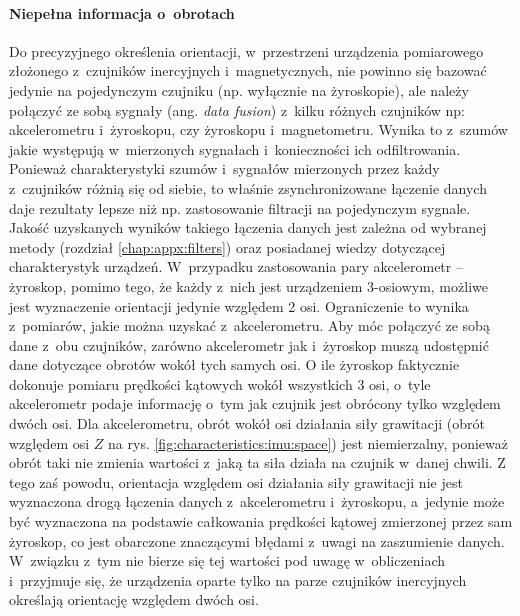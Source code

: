 \paragraph*{Niepełna informacja o~obrotach}
Do precyzyjnego określenia orientacji, w~przestrzeni urządzenia pomiarowego złożonego z~czujników inercyjnych i~magnetycznych, nie powinno się bazować jedynie na pojedynczym czujniku (np. wyłącznie na żyroskopie), ale należy połączyć ze sobą sygnały (ang. \emph{data fusion}) z~kilku różnych czujników np: akcelerometru i~żyroskopu, czy żyroskopu i~magnetometru. Wynika to z~szumów jakie występują w~mierzonych sygnałach i~konieczności ich odfiltrowania. Ponieważ charakterystyki szumów i~sygnałów mierzonych przez każdy z~czujników różnią się od siebie, to właśnie zsynchronizowane łączenie danych daje rezultaty lepsze niż np. zastosowanie filtracji na pojedynczym sygnale. Jakość uzyskanych wyników takiego łączenia danych jest zależna od wybranej metody (rozdział \ref{chap:appx:filters}) oraz posiadanej wiedzy dotyczącej charakterystyk urządzeń. W~przypadku zastosowania pary akcelerometr -- żyroskop, pomimo tego, że każdy z~nich jest urządzeniem 3-osiowym, możliwe jest wyznaczenie orientacji jedynie względem 2 osi. Ograniczenie to wynika z~pomiarów, jakie można uzyskać z~akcelerometru. Aby móc połączyć ze sobą dane z~obu czujników, zarówno akcelerometr jak i~żyroskop muszą udostępnić dane dotyczące obrotów wokół tych samych osi. O ile żyroskop faktycznie dokonuje pomiaru prędkości kątowych wokół wszystkich 3 osi, o~tyle akcelerometr podaje informację o~tym jak czujnik jest obrócony tylko względem dwóch osi. Dla akcelerometru, obrót wokół osi działania siły grawitacji (obrót względem osi $Z$ na rys. \ref{fig:characteristics:imu:space}) jest niemierzalny, ponieważ obrót taki nie zmienia wartości z~jaką ta siła działa na czujnik w~danej chwili. Z tego zaś powodu, orientacja względem osi działania siły grawitacji nie jest wyznaczona drogą łączenia danych z~akcelerometru i~żyroskopu, a~jedynie może być wyznaczona na podstawie całkowania prędkości kątowej zmierzonej przez sam żyroskop, co jest obarczone znaczącymi błędami z~uwagi na zaszumienie danych. W~związku z~tym nie bierze się tej wartości pod uwagę w~obliczeniach i~przyjmuje się, że urządzenia oparte tylko na parze czujników inercyjnych określają orientację względem dwóch osi.\\
		
